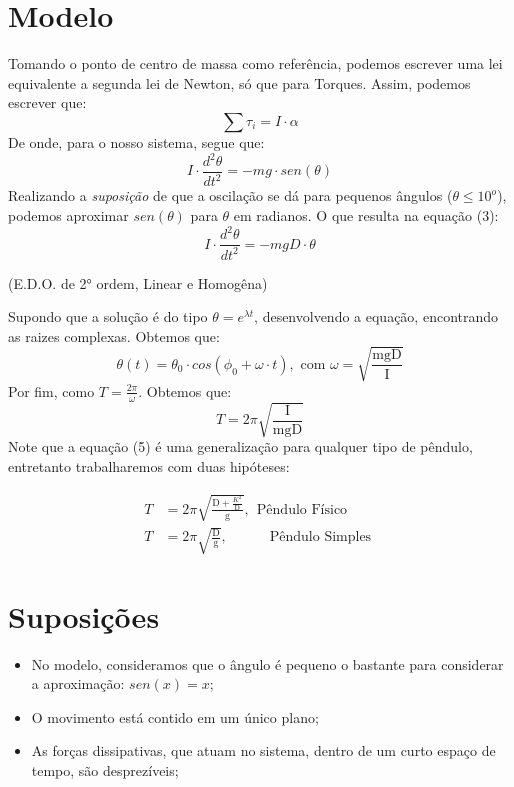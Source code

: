 \documentclass[hidelinks,a4paper,10pt]{article}
\begin{document}
\section*{Modelo}
\qquad Tomando o ponto de centro de massa como referência, 
podemos escrever uma lei equivalente a segunda lei de Newton, só que para Torques.
Assim, podemos escrever que:
\begin{equation}
    \sum{\tau_i} =  I\cdot \alpha
\end{equation}
\qquad De onde, para o nosso sistema, segue que:
\begin{equation}
    I \cdot \frac{d^2\theta}{dt ^2} = - mg\cdot sen(\theta)
\end{equation}
\qquad Realizando a \textit{suposição} de que a oscilação se dá para pequenos ângulos
($\theta \leq 10^{o} $), podemos aproximar $sen(\theta)$ para $\theta$ em radianos.
O que resulta na equação (3):
\begin{equation}
    I \cdot \frac{d^2\theta}{dt ^2} = - mgD\cdot \theta
\end{equation}
\begin{center}
    \small{(E.D.O. de 2° ordem, Linear e Homogêna)}
\end{center}
\qquad Supondo que a solução é do tipo $\theta = e^{\lambda t}$, desenvolvendo
a equação, encontrando as raizes complexas. Obtemos que:
\begin{equation}
    \theta(t) = \theta_0 \cdot cos\left( \phi_0 + \omega \cdot t\right), \text{ com } \omega = \sqrt{\frac{\text{mgD}}{\text{I}}}
\end{equation}
\qquad Por fim, como $T = \frac{2\pi}{\omega}$. Obtemos que:
\begin{equation}
   \boxed{T = 2\pi \sqrt{\frac{\text{I}}{\text{mgD}}}}
\end{equation}
\qquad Note que a equação (5) é uma generalização para qualquer
tipo de pêndulo, entretanto trabalharemos com duas hipóteses:


\begin{align}
        T &= 2\pi \sqrt{\frac{\text{D} + \frac{\text{$K^2$}}{\text{D}}}{\text{g}}}, \ \ \text{Pêndulo Físico }\\
        T &= 2\pi \sqrt{\frac{\text{D}}{\text{g}}},\quad \qquad \text{Pêndulo Simples }
\end{align}

\section*{Suposições}
\begin{itemize}
    \item No modelo, consideramos que o ângulo é pequeno o bastante para considerar a aproximação: \(sen(x) = x\);
    \item O movimento está contido em um único plano;
    \item As forças dissipativas, que atuam no sistema, dentro de um curto espaço de tempo, são desprezíveis;
\end{itemize}
\end{document}

